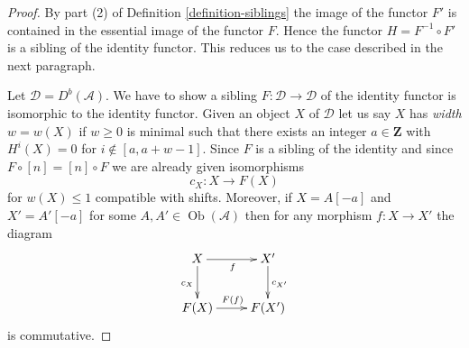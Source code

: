 \documentclass[10pt,a4paper]{amsart}
\theoremstyle{plain}
\theoremstyle{definition}
\theoremstyle{remark}
\numberwithin{equation}{subsection}
\def\Ob{\mathop{\mathrm{Ob}}\nolimits}
\begin{document}
\begin{proof}
By part (2) of Definition \ref{definition-siblings} the image of the functor
$F'$ is contained in the essential image of the functor $F$. Hence
the functor $H = F^{-1} \circ F'$ is a sibling of the identity functor.
This reduces us to the case described in the next paragraph.

\medskip\noindent
Let $\mathcal{D} = D^b(\mathcal{A})$. We have to show a sibling
$F : \mathcal{D} \to \mathcal{D}$ of the identity functor is
isomorphic to the identity functor. Given an object $X$ of $\mathcal{D}$
let us say $X$ has {\it width} $w = w(X)$ if $w \geq 0$ is minimal
such that there exists an integer $a \in \mathbf{Z}$ with $H^i(X) = 0$
for $i \not \in [a, a + w - 1]$. Since $F$ is a sibling of the identity
and since $F \circ [n] = [n] \circ F$ we are already given isomorphisms
$$
c_X : X \to F(X)
$$
for $w(X) \leq 1$ compatible with shifts. Moreover, if $X = A[-a]$ and
$X' = A'[-a]$ for some $A, A' \in \Ob(\mathcal{A})$ then for any morphism
$f : X \to X'$ the diagram
\begin{equation}
\label{equation-to-show}
\vcenter{
\xymatrix{
X \ar[d]_{c_X} \ar[r]_f &
X' \ar[d]^{c_{X'}} \\
F(X) \ar[r]^{F(f)} &
F(X')
}
}
\end{equation}
is commutative.


\end{proof}
\end{document}
